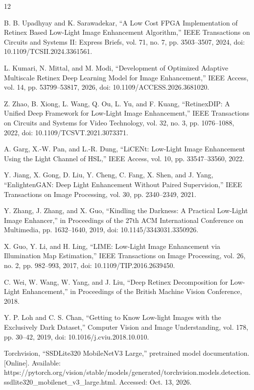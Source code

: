 \documentclass[conference]{IEEEtran}
\begin{document}
\begin{thebibliography}{12}

 B. B. Upadhyay and K. Sarawadekar, ``A Low Cost FPGA Implementation of Retinex Based Low-Light Image Enhancement Algorithm,'' IEEE Transactions on Circuits and Systems II: Express Briefs, vol. 71, no. 7, pp. 3503--3507, 2024, doi: 10.1109/TCSII.2024.3361561.

 L. Kumari, N. Mittal, and M. Modi, ``Development of Optimized Adaptive Multiscale Retinex Deep Learning Model for Image Enhancement,'' IEEE Access, vol. 14, pp. 53799--53817, 2026, doi: 10.1109/ACCESS.2026.3681020.

 Z. Zhao, B. Xiong, L. Wang, Q. Ou, L. Yu, and F. Kuang, ``RetinexDIP: A Unified Deep Framework for Low-Light Image Enhancement,'' IEEE Transactions on Circuits and Systems for Video Technology, vol. 32, no. 3, pp. 1076--1088, 2022, doi: 10.1109/TCSVT.2021.3073371.

 A. Garg, X.-W. Pan, and L.-R. Dung, ``LiCENt: Low-Light Image Enhancement Using the Light Channel of HSL,'' IEEE Access, vol. 10, pp. 33547--33560, 2022.

 Y. Jiang, X. Gong, D. Liu, Y. Cheng, C. Fang, X. Shen, and J. Yang, ``EnlightenGAN: Deep Light Enhancement Without Paired Supervision,'' IEEE Transactions on Image Processing, vol. 30, pp. 2340--2349, 2021.

 Y. Zhang, J. Zhang, and X. Guo, ``Kindling the Darkness: A Practical Low-Light Image Enhancer,'' in Proceedings of the 27th ACM International Conference on Multimedia, pp. 1632--1640, 2019, doi: 10.1145/3343031.3350926.

 X. Guo, Y. Li, and H. Ling, ``LIME: Low-Light Image Enhancement via Illumination Map Estimation,'' IEEE Transactions on Image Processing, vol. 26, no. 2, pp. 982--993, 2017, doi: 10.1109/TIP.2016.2639450.

 C. Wei, W. Wang, W. Yang, and J. Liu, ``Deep Retinex Decomposition for Low-Light Enhancement,'' in Proceedings of the British Machine Vision Conference, 2018.

 Y. P. Loh and C. S. Chan, ``Getting to Know Low-light Images with the Exclusively Dark Dataset,'' Computer Vision and Image Understanding, vol. 178, pp. 30--42, 2019, doi: 10.1016/j.cviu.2018.10.010.

 Torchvision, ``SSDLite320 MobileNetV3 Large,'' pretrained model documentation. [Online]. Available: https://pytorch.org/vision/stable/models/generated/torchvision.models.detection.ssdlite320\_mobilenet\_v3\_large.html. Accessed: Oct. 13, 2026.


\end{thebibliography}
\end{document}
